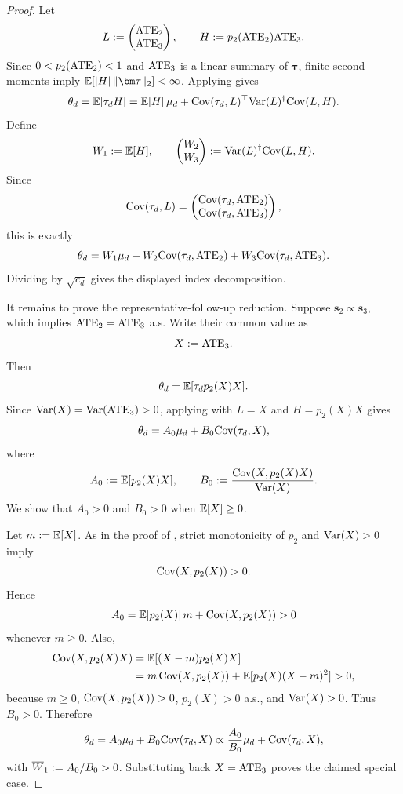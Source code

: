 \begin{proof}
  Let
  \[
    L:=
    \begin{pmatrix}
      \mathrm{ATE}_2\\
      \mathrm{ATE}_3
    \end{pmatrix},
    \qquad
    H:= p_2(\mathrm{ATE}_2)\mathrm{ATE}_3.
  \]
  Since \(0<p_2(\mathrm{ATE}_2)<1\) and \(\mathrm{ATE}_3\) is a linear summary of \(\bm\tau\), finite second moments imply \(\E[|H|\,\|\bm\tau\|_2]<\infty\).
  Applying  gives
  \[
    \theta_d
    =
    \mathbb{E}[\tau_dH]
    =
    \mathbb{E}[H] \, \mu_d
    +
    {\rm Cov}(\tau_d,L)^\top{\rm Var}(L)^\dagger{\rm Cov}(L,H).
  \]
  Define
  \[
    W_1:= \mathbb{E}[H],
    \qquad
    \begin{pmatrix}
      W_2\\
      W_3
    \end{pmatrix}
    :=
    {\rm Var}(L)^\dagger{\rm Cov}(L,H).
  \]
  Since
  \[
    {\rm Cov}(\tau_d,L)
    =
    \begin{pmatrix}
      {\rm Cov}(\tau_d,\mathrm{ATE}_2)\\
      {\rm Cov}(\tau_d,\mathrm{ATE}_3)
    \end{pmatrix},
  \]
  this is exactly
  \[
    \theta_d
    =
    W_1\mu_d
    +
    W_2{\rm Cov}(\tau_d,\mathrm{ATE}_2)
    +
    W_3{\rm Cov}(\tau_d,\mathrm{ATE}_3).
  \]
  Dividing by \(\sqrt{c_d}\) gives the displayed index decomposition.

  It remains to prove the representative-follow-up reduction.
  Suppose \(\bm s_2\propto\bm s_3\), which implies \(\mathrm{ATE}_2=\mathrm{ATE}_3\) a.s.
  Write their common value as
  \[
    X:= \mathrm{ATE}_3.
  \]
  Then
  \[
    \theta_d
    =
    \mathbb{E}[\tau_d p_2(X)X].
  \]
  Since \({\rm Var}(X)={\rm Var}(\mathrm{ATE}_3)>0\), applying  with \(L=X\) and \(H=p_2(X)X\) gives
  \[
    \theta_d
    =
    A_0\mu_d+B_0{\rm Cov}(\tau_d,X),
  \]
  where
  \[
    A_0:= \mathbb{E}[p_2(X)X],
    \qquad
    B_0:= \frac{{\rm Cov}(X,p_2(X)X)}{{\rm Var}(X)}.
  \]
  We show that \(A_0>0\) and \(B_0>0\) when \(\mathbb{E}[X]\ge0\).

  Let \(m:=\mathbb{E}[X]\).
  As in the proof of , strict monotonicity of \(p_2\) and \({\rm Var}(X)>0\) imply
  \[
    {\rm Cov}(X,p_2(X))>0.
  \]
  Hence
  \[
    A_0
    =
    \mathbb{E}[p_2(X)]\,m+
    {\rm Cov}(X,p_2(X))
    >0
  \]
  whenever \(m\ge0\).
  Also,
  \begin{align*}
    {\rm Cov}(X,p_2(X)X)
    &=
    \mathbb{E}[(X-m)p_2(X)X] \\
    &=
    m\,{\rm Cov}(X,p_2(X))
    +
    \mathbb{E}[p_2(X)(X-m)^2]
    >0,
  \end{align*}
  because \(m\ge0\), \({\rm Cov}(X,p_2(X))>0\), \(p_2(X)>0\) a.s., and \({\rm Var}(X)>0\).
  Thus \(B_0>0\).
  Therefore
  \[
    \theta_d
    =
    A_0\mu_d+B_0{\rm Cov}(\tau_d,X)
    \propto
    \frac{A_0}{B_0}\mu_d+
    {\rm Cov}(\tau_d,X),
  \]
  with \(\overline W_1:= A_0/B_0>0\).
  Substituting back \(X=\mathrm{ATE}_3\) proves the claimed special case.
\end{proof}

